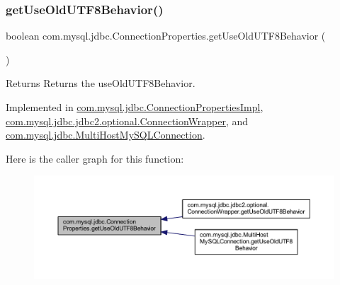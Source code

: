 \subsubsection{\texorpdfstring{get\+Use\+Old\+U\+T\+F8\+Behavior()}{getUseOldUTF8Behavior()}}
{\footnotesize\ttfamily boolean com.\+mysql.\+jdbc.\+Connection\+Properties.\+get\+Use\+Old\+U\+T\+F8\+Behavior (\begin{DoxyParamCaption}{ }\end{DoxyParamCaption})}

\begin{DoxyReturn}{Returns}
Returns the use\+Old\+U\+T\+F8\+Behavior. 
\end{DoxyReturn}


Implemented in \mbox{\hyperlink{classcom_1_1mysql_1_1jdbc_1_1_connection_properties_impl_a90d58fee4f3da4dcb8700798dc4a4ff0}{com.\+mysql.\+jdbc.\+Connection\+Properties\+Impl}}, \mbox{\hyperlink{classcom_1_1mysql_1_1jdbc_1_1jdbc2_1_1optional_1_1_connection_wrapper_aab5bc3ee546eb81a0fd5a28b576f6338}{com.\+mysql.\+jdbc.\+jdbc2.\+optional.\+Connection\+Wrapper}}, and \mbox{\hyperlink{classcom_1_1mysql_1_1jdbc_1_1_multi_host_my_s_q_l_connection_a36f0772c382523e46208fde9a19ae456}{com.\+mysql.\+jdbc.\+Multi\+Host\+My\+S\+Q\+L\+Connection}}.

Here is the caller graph for this function\+:\nopagebreak
\begin{figure}[H]
\begin{center}
\leavevmode
\includegraphics[width=350pt]{interfacecom_1_1mysql_1_1jdbc_1_1_connection_properties_a4f8cf54b1bafd8f3e11f32f5c3609dd6_icgraph}
\end{center}
\end{figure}
\mbox{\label{interfacecom_1_1mysql_1_1jdbc_1_1_connection_properties_ae8e53bc10eb54dfdc635c30ff5efca90}} 
